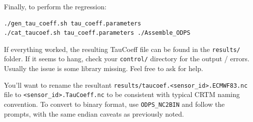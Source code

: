Finally, to perform the regression:


\begin{verbatim}
./gen_tau_coeff.sh tau_coeff.parameters
./cat_taucoef.sh tau_coeff.parameters ./Assemble_ODPS 
\end{verbatim}

If everything worked, the resulting TauCoeff file can be found in the \verb|results/| folder.  If it seems to hang, check your \verb|control/| directory for the output / errors.  Usually the issue is some library missing.   Feel free to ask for help.

You'll want to rename the resultant \verb|results/taucoef.<sensor_id>.ECMWF83.nc| file to \verb|<sensor_id>.TauCoeff.nc| to be consistent with typical CRTM naming convention.  
To convert to binary format, use \verb|ODPS_NC2BIN| and follow the prompts, with the same endian caveats as previously noted. 



